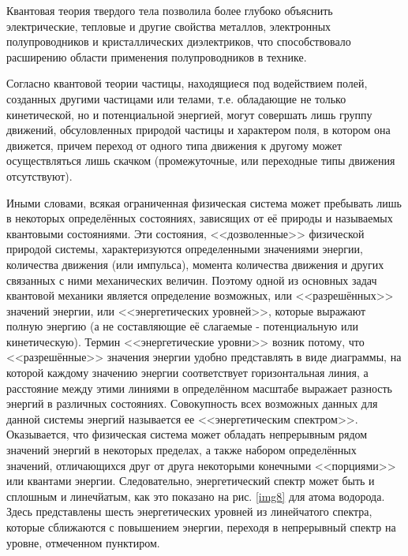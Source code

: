 \documentclass[a4paper,10pt]{book}
\begin{document}
Квантовая теория твердого тела позволила более глубоко объяснить электрические, тепловые и другие свойства металлов, электронных полупроводников и кристаллических диэлектриков, что способствовало расширению области применения полупроводников в технике.

Согласно квантовой теории частицы, находящиеся под водействием полей, созданных другими частицами или телами, т.е. обладающие не только кинетической, но и потенциальной энергией, могут совершать лишь группу движений, обсуловленных природой частицы и характером поля, в котором она движется, причем переход от одного типа движения к другому может осуществляться лишь скачком (промежуточные, или переходные типы движения отсутствуют).

Иными словами, всякая ограниченная физическая система может пребывать лишь в некоторых определённых состояниях, зависящих от её природы и называемых квантовыми состояниями. Эти состояния, <<дозволенные>> физической природой системы, характеризуются определенными значениями энергии, количества движения (или импульса), момента количества движения и других связанных с ними механических величин. Поэтому одной из основных задач квантовой механики является определение возможных, или <<разрешённых>> значений энергии, или <<энергетических уровней>>, которые выражают полную энергию (а не составляющие её слагаемые - потенциальную или кинетическую). Термин <<энергетические уровни>> возник потому, что <<разрешённые>> значения энергии удобно представлять в виде диаграммы, на которой каждому значению энергии соответствует горизонтальная линия, а расстояние между этими линиями в определённом масштабе выражает разность энергий в различных состояниях. Совокупность всех возможных данных для данной системы энергий называется ее <<энергетическим спектром>>. Оказывается, что физическая система может обладать непрерывным рядом значений энергий в некоторых пределах, а также набором определённых значений, отличающихся друг от друга некоторыми конечными <<порциями>> или квантами энергии. 
Следовательно, энергетический спектр может быть и сплошным и линечйатым, как это показано на рис. \ref{img8} для атома водорода. Здесь представлены шесть энергетических уровней из линейчатого спектра, которые сближаются с повышением энергии, переходя в непрерывный спектр на уровне, отмеченном пунктиром.
\end{document}
